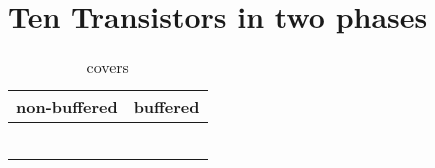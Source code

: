 \section{Ten Transistors in two phases}

\begin{table}[ht]
\centering
\caption*{covers}

\begin{tabular}{cc}
    \toprule
    non-buffered & buffered \\
    \midrule

    \nameref{cell:AOI32} & \nameref{cell:AO32} \\
    \nameref{cell:OAI32} & \nameref{cell:OA32} \\
    \nameref{cell:AAOI32} & \nameref{cell:AAO32} \\
    \nameref{cell:OOAI32} & \nameref{cell:OOA32} \\
    \nameref{cell:AAOI221} & \nameref{cell:AAO221} \\
    \nameref{cell:OOAI221} & \nameref{cell:OOA221}

\end{tabular}

\end{table}

 
 
 
 
 
 
